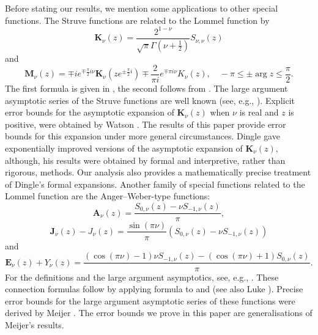 \documentclass[a4paper,twoside,10pt]{amsart}
\numberwithin{equation}{section}
\begin{document}
Before stating our results, we mention some applications to other special functions. The Struve functions are related to the Lommel function by
\begin{equation}\label{eq44}
\mathbf{K}_\nu  \left( z \right) = \frac{2^{1 - \nu }}{\sqrt \pi  \Gamma \left(\nu  + \frac{1}{2} \right)}S_{\nu ,\nu } \left( z \right)
\end{equation}
and
\begin{equation}\label{eq45}
\mathbf{M}_\nu  \left( z \right) =  \mp ie^{ \mp \frac{\pi }{2}i\nu } \mathbf{K}_\nu  \left( {ze^{ \pm \frac{\pi }{2}i} } \right) \mp \frac{2}{{\pi i}}e^{ \mp \pi i\nu } K_\nu  \left( z \right), \quad - \pi  \le  \pm \arg z \le \frac{\pi }{2}.
\end{equation}
The first formula is given in \cite[p. 444]{Dingle}, the second follows from \cite[11.2.E2, 11.2.E5 and 11.2.E6]{NIST}. The large argument asymptotic series of the Struve functions are well known (see, e.g., \cite[11.6.i]{NIST}). Explicit error bounds for the asymptotic expansion of $\mathbf{K}_\nu  \left( z \right)$ when $\nu$ is real and $z$ is positive, were obtained by Watson \cite[p. 333]{Watson}. The results of this paper provide error bounds for this expansion under more general circumstances. Dingle \cite[p. 445]{Dingle} gave exponentially improved versions of the asymptotic expansion of $\mathbf{K}_\nu  \left( z \right)$, although, his results were obtained by formal and interpretive, rather than rigorous, methods. Our analysis also provides a mathematically precise treatment of Dingle's formal expansions. Another family of special functions related to the Lommel function are the Anger--Weber-type functions:
\[
\mathbf{A}_\nu  \left( z \right) = \frac{{S_{0,\nu } \left( z \right) - \nu S_{ - 1,\nu } \left( z \right)}}{\pi },
\]
\[
\mathbf{J}_\nu  \left( z \right) - J_\nu  \left( z \right)= \frac{{\sin \left( {\pi \nu } \right)}}{\pi }\left( {S_{0,\nu } \left( z \right) - \nu S_{ - 1,\nu } \left( z \right)} \right)
\]
and
\[
\mathbf{E}_\nu  \left( z \right) + Y_\nu  \left( z \right)= \frac{{\left( {\cos \left( {\pi \nu } \right) - 1} \right)\nu S_{ - 1,\nu } \left( z \right) - \left( {\cos \left( {\pi \nu } \right) + 1} \right)S_{0,\nu } \left( z \right)}}{\pi } .
\]
For the definitions and the large argument asymptotics, see, e.g., \cite[11.10.i and 11.11.i]{NIST}. These connection formulas follow by applying formula \cite[11.9.E5]{NIST} to \cite[11.10.E17]{NIST} and \cite[11.10.E18]{NIST} (see also Luke \cite[p. 84]{Luke}). Precise error bounds for the large argument asymptotic series of these functions were derived by Meijer \cite{Meijer}. The error bounds we prove in this paper are generalisations of Meijer's results.
\end{document}
